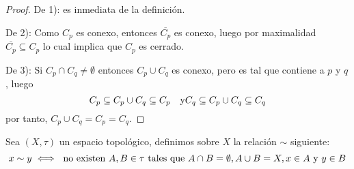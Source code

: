 \documentclass[12pt]{report}
\theoremstyle{largebreak}
\newcommand{\Cls}[1]{\ensuremath{\overline{#1}}}
\begin{document}
    \begin{proof}
        De 1): es inmediata de la definición.

        De 2): Como $C_p$ es conexo, entonces $\Cls{C_p}$ es conexo, luego por maximalidad $\Cls{C_p}\subseteq C_p$ lo cual implica que $C_p$ es cerrado.

        De 3): Si $C_p\cap C_q\neq\emptyset$ entonces $C_p\cup C_q$ es conexo, pero es tal que contiene a $p$ y $q$, luego
        \begin{equation*}
            C_p\subseteq C_p\cup C_q\subseteq C_p\quad\textup{y}C_q\subseteq C_p\cup C_q\subseteq C_q
        \end{equation*}
        por tanto, $C_p\cup C_q=C_p=C_q$.
    \end{proof}

    \begin{mydef}
        Sea $(X,\tau)$ un espacio topológico, definimos sobre $X$ la relación $\sim$ siguiente:
        \begin{equation*}
            x\sim y\iff \textup{ no existen }A,B\in\tau\textup{ tales que }A\cap B=\emptyset, A\cup B=X, x\in A\textup{ y }y\in B
        \end{equation*}
    \end{mydef}
\end{document}
